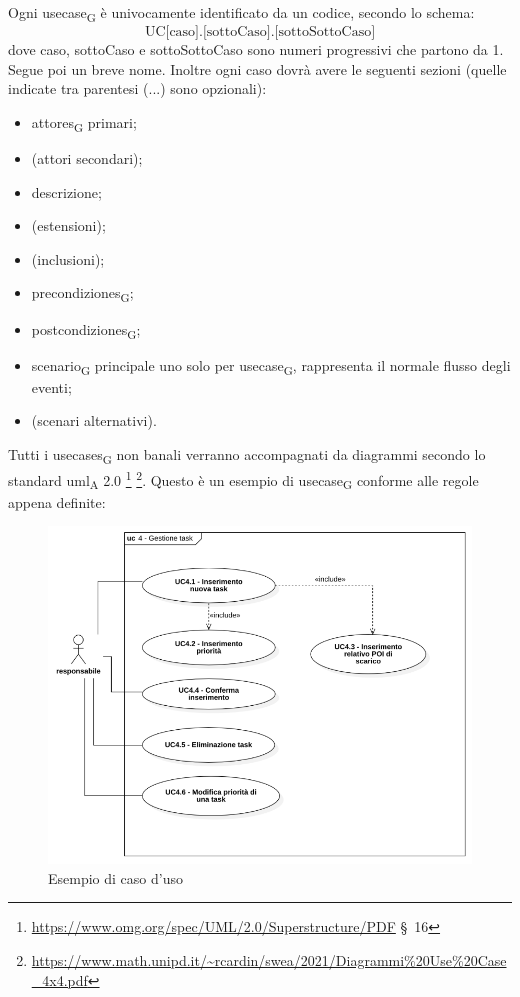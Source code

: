                Ogni \gls{usecase}\textsubscript{G} è univocamente identificato da un codice, secondo lo schema:
                $$\text{UC[caso].[sottoCaso].[sottoSottoCaso]}$$
                dove caso, sottoCaso e sottoSottoCaso sono numeri progressivi che partono da 1. Segue poi un breve nome. Inoltre ogni caso dovrà avere le seguenti sezioni (quelle indicate tra parentesi (...) sono opzionali):
                \begin{itemize}
                    \item \glspl{attore}\textsubscript{G} primari;
                    \item (attori secondari);
                    \item descrizione;
                    \item (estensioni);
                    \item (inclusioni);
                    \item \glspl{precondizione}\textsubscript{G};
                    \item \glspl{postcondizione}\textsubscript{G};
                    \item \gls{scenario}\textsubscript{G} principale uno solo per \gls{usecase}\textsubscript{G}, rappresenta il normale flusso degli eventi;
                    \item (scenari alternativi).
                \end{itemize}

                Tutti i \glspl{usecase}\textsubscript{G} non banali verranno accompagnati da diagrammi secondo lo standard \acrshort{uml}\textsubscript{A} 2.0 \footnote{\url{https://www.omg.org/spec/UML/2.0/Superstructure/PDF} \S\ 16} \footnote{\url{https://www.math.unipd.it/~rcardin/swea/2021/Diagrammi\%20Use\%20Case_4x4.pdf}}.
                Questo è un esempio di \gls{usecase}\textsubscript{G} conforme alle regole appena definite:
                \begin{figure}[H]
                    \centering
                    \includegraphics[scale=0.5]{res/images/esempio_use_case.png}
                    \caption{Esempio di caso d'uso}
                \end{figure}

